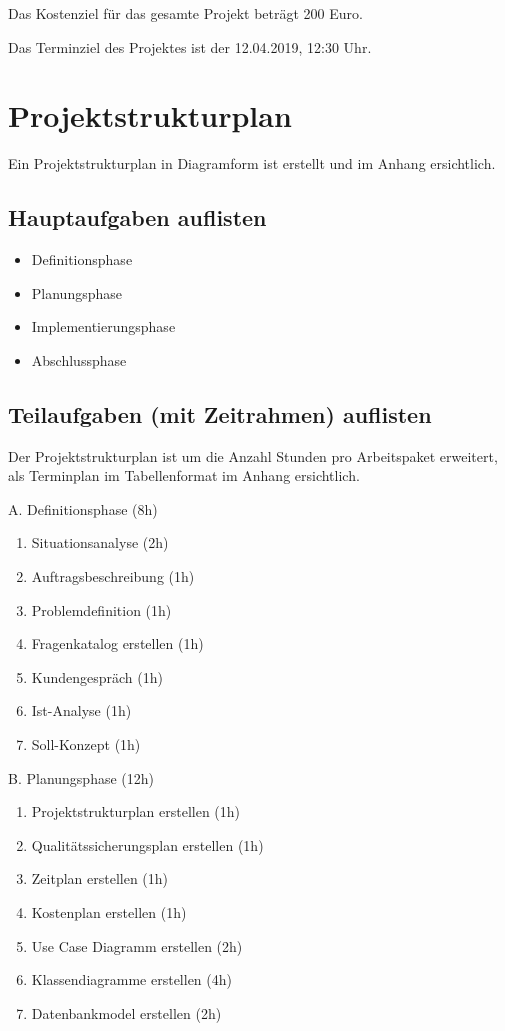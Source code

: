 \documentclass[11pt, a4paper]{article}
\begin{document}
Das Kostenziel für das gesamte Projekt beträgt 200 Euro.

Das Terminziel des Projektes ist der 12.04.2019, 12:30 Uhr.

\section{Projektstrukturplan}
Ein Projektstrukturplan in Diagramform ist erstellt und im Anhang ersichtlich.

\subsection{Hauptaufgaben auflisten}
\begin{itemize}
  \item Definitionsphase
  \item Planungsphase
  \item Implementierungsphase
  \item Abschlussphase
\end{itemize}

\subsection{Teilaufgaben (mit Zeitrahmen) auflisten}
Der Projektstrukturplan ist um die Anzahl Stunden pro Arbeitspaket erweitert,
als Terminplan im Tabellenformat im Anhang ersichtlich.



\noindent A. Definitionsphase (8h)
\begin{enumerate}
  \item Situationsanalyse (2h)
  \item Auftragsbeschreibung (1h)
  \item Problemdefinition (1h)
  \item Fragenkatalog erstellen (1h)
  \item Kundengespräch (1h)
  \item Ist-Analyse (1h)
  \item Soll-Konzept (1h)
\end{enumerate}

\noindent B. Planungsphase (12h)
\begin{enumerate}
  \item Projektstrukturplan erstellen (1h)
  \item Qualitätssicherungsplan erstellen (1h)
  \item Zeitplan erstellen (1h)
  \item Kostenplan erstellen (1h)
  \item Use Case Diagramm erstellen (2h)
  \item Klassendiagramme erstellen (4h)
  \item Datenbankmodel erstellen (2h)
\end{enumerate}
\end{document}
